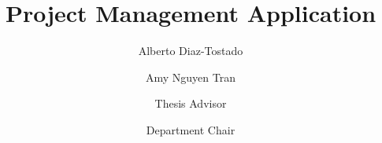 \documentclass{scu-thesis}
\author{Alberto Diaz-Tostado}
\author{Amy Nguyen Tran}
\title{Project Management Application}
\begin{document}
\frontmatter
\signature{Thesis Advisor}
\signature{Department Chair}

\maketitle


\tableofcontents
\listoffigures
\listoftables

\mainmatter






\backmatter
\immediate{}
\end{document}

